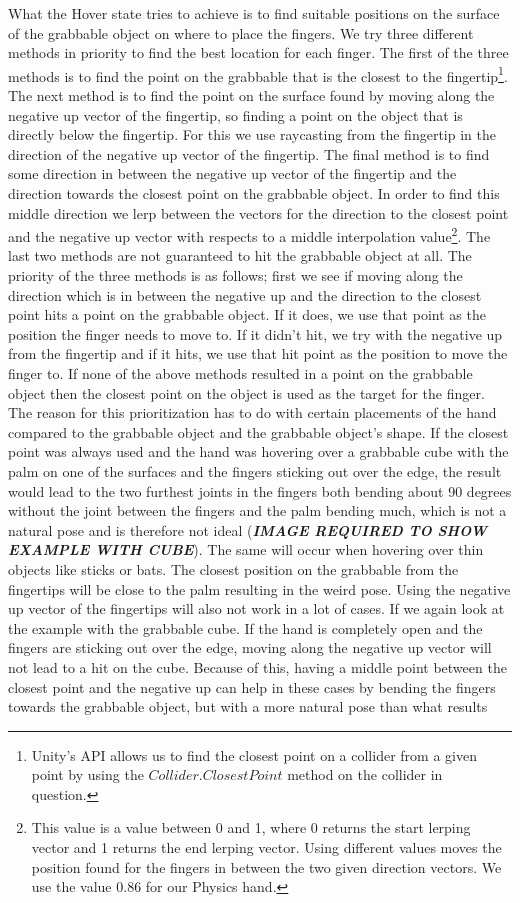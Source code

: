What the Hover state tries to achieve is to find suitable positions on the surface of the grabbable object on where to place the fingers. We try three different methods in priority to find the best location for each finger. The first of the three methods is to find the point on the grabbable that is the closest to the fingertip\footnote{Unity's API allows us to find the closest point on a collider from a given point by using the $Collider.ClosestPoint$ method on the collider in question.}. The next method is to find the point on the surface found by moving along the negative up vector of the fingertip, so finding a point on the object that is directly below the fingertip. For this we use raycasting from the fingertip in the direction of the negative up vector of the fingertip. The final method is to find some direction in between the negative up vector of the fingertip and the direction towards the closest point on the grabbable object. In order to find this middle direction we lerp between the vectors for the direction to the closest point and the negative up vector with respects to a middle interpolation value\footnote{This value is a value between 0 and 1, where 0 returns the start lerping vector and 1 returns the end lerping vector. Using different values moves the position found for the fingers in between the two given direction vectors. We use the value 0.86 for our Physics hand.}. The last two methods are not guaranteed to hit the grabbable object at all. The priority of the three methods is as follows; first we see if moving along the direction which is in between the negative up and the direction to the closest point hits a point on the grabbable object. If it does, we use that point as the position the finger needs to move to. If it didn't hit, we try with the negative up from the fingertip and if it hits, we use that hit point as the position to move the finger to. If none of the above methods resulted in a point on the grabbable object then the closest point on the object is used as the target for the finger. The reason for this prioritization has to do with certain placements of the hand compared to the grabbable object and the grabbable object's shape. If the closest point was always used and the hand was hovering over a grabbable cube with the palm on one of the surfaces and the fingers sticking out over the edge, the result would lead to the two furthest joints in the fingers both bending about 90 degrees without the joint between the fingers and the palm bending much, which is not a natural pose and is therefore not ideal (\textbf{\textit{IMAGE REQUIRED TO SHOW EXAMPLE WITH CUBE}}). The same will occur when hovering over thin objects like sticks or bats. The closest position on the grabbable from the fingertips will be close to the palm resulting in the weird pose. Using the negative up vector of the fingertips will also not work in a lot of cases. If we again look at the example with the grabbable cube. If the hand is completely open and the fingers are sticking out over the edge, moving along the negative up vector will not lead to a hit on the cube. Because of this, having a middle point between the closest point and the negative up can help in these cases by bending the fingers towards the grabbable object, but with a more natural pose than what results 